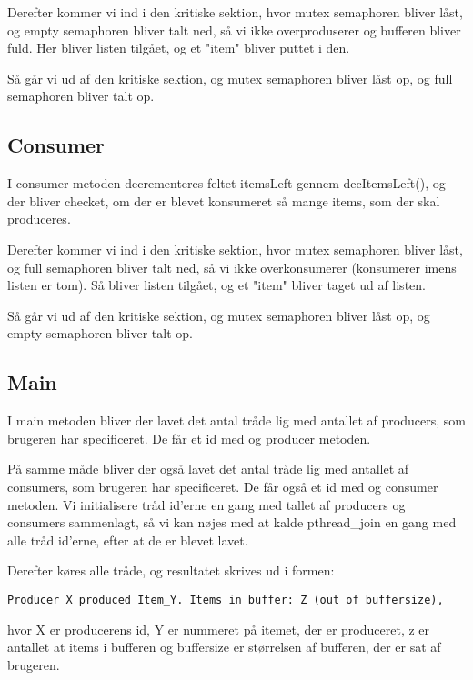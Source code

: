 Derefter kommer vi ind i den kritiske sektion, hvor mutex semaphoren bliver låst, og empty semaphoren bliver talt ned, så vi ikke overproduserer og bufferen bliver fuld. Her bliver listen tilgået, og et "item" bliver puttet i den.

Så går vi ud af den kritiske sektion, og mutex semaphoren bliver låst op, og full semaphoren bliver talt op.

\subsection{Consumer}
I consumer metoden decrementeres feltet itemsLeft gennem decItemsLeft(), og der bliver checket, om der er blevet konsumeret så mange items, som der skal produceres.

Derefter kommer vi ind i den kritiske sektion, hvor mutex semaphoren bliver låst, og full semaphoren bliver talt ned, så vi ikke overkonsumerer (konsumerer imens listen er tom). Så bliver listen tilgået, og et "item" bliver taget ud af listen.

Så går vi ud af den kritiske sektion, og mutex semaphoren bliver låst op, og empty semaphoren bliver talt op.

\subsection{Main}
I main metoden bliver der lavet det antal tråde lig med antallet af producers, som brugeren har specificeret. De får et id med og producer metoden.

På samme måde bliver der også lavet det antal tråde lig med antallet af consumers, som brugeren har specificeret. De får også et id med og consumer metoden. Vi initialisere tråd id'erne en gang med tallet af producers og consumers sammenlagt, så vi kan nøjes med at kalde pthread\_join en gang med alle tråd id'erne, efter at de er blevet lavet.

Derefter køres alle tråde, og resultatet skrives ud i formen:
\begin{verbatim}
Producer X produced Item_Y. Items in buffer: Z (out of buffersize),
\end{verbatim}
hvor X er producerens id, Y er nummeret på itemet, der er produceret, z er antallet at items i bufferen og buffersize er størrelsen af bufferen, der er sat af brugeren.
